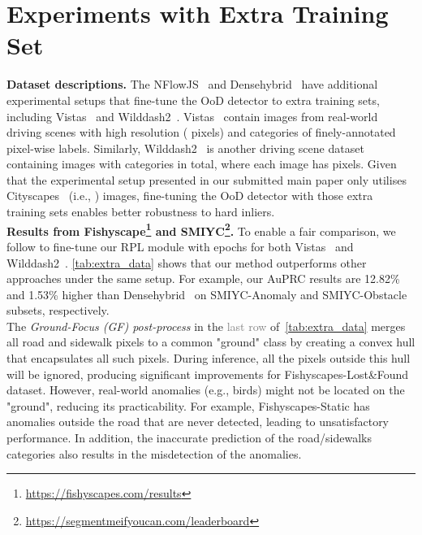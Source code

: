 \documentclass[10pt,twocolumn,letterpaper]{article}
\begin{document}
\section{Experiments with Extra Training Set}
\noindent\textbf{Dataset descriptions.} The NFlowJS~\cite{grcic2021dense} and Densehybrid~\cite{grcic2022densehybrid} have additional experimental setups that fine-tune the OoD detector to  extra training sets, including Vistas~\cite{neuhold2017mapillary} and Wilddash2~\cite{zendel2018wilddash}. Vistas~\cite{neuhold2017mapillary} contain  images from real-world driving scenes with high resolution ( pixels) and  categories of finely-annotated pixel-wise labels. Similarly, Wilddash2~\cite{zendel2018wilddash} is another driving scene dataset containing  images with  categories in total, where each image has  pixels. Given that the experimental setup presented in our submitted main paper only utilises Cityscapes~\cite{cordts2016cityscapes} (i.e., ) images, fine-tuning the OoD detector with those extra training sets enables better robustness to hard inliers.  \\
\noindent\textbf{Results from Fishyscape\protect\footnote{\url{https://fishyscapes.com/results}} and SMIYC\protect\footnote{\url{https://segmentmeifyoucan.com/leaderboard}}.} To enable a fair comparison, we follow \cite{grcic2022densehybrid, grcic2021dense} to fine-tune our RPL module with  epochs for both Vistas~\cite{neuhold2017mapillary} and Wilddash2~\cite{zendel2018wilddash}. \cref{tab:extra_data} shows that our method outperforms other approaches under the same setup. For example, our AuPRC results are 12.82\% and 1.53\% higher than Densehybrid~\cite{grcic2022densehybrid}  on SMIYC-Anomaly and SMIYC-Obstacle subsets, respectively.\\
\noindent The \textit{Ground-Focus (GF) post-process} in the \textcolor{gray}{last row} of~\cref{tab:extra_data} merges all road and sidewalk pixels to a common "ground" class by creating a convex hull that encapsulates all such pixels. During inference, all the pixels outside this hull will be ignored, producing significant improvements for Fishyscapes-Lost\&Found dataset. However, real-world anomalies (e.g., birds) might not be located on the "ground", reducing its practicability. For example, Fishyscapes-Static has anomalies outside the road that are never detected, leading to unsatisfactory performance. In addition, the inaccurate prediction of the road/sidewalks categories also results in the misdetection of the anomalies.  
\end{document}
